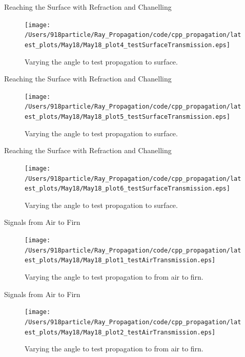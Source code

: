 \documentclass{beamer}
\begin{document}
\begin{frame}{Reaching the Surface with Refraction and Chanelling}
\begin{figure}
\begin{center}
\texttt{[image: /Users/918particle/Ray\_Propagation/code/cpp\_propagation/latest\_plots/May18/May18\_plot4\_testSurfaceTransmission.eps]}
\caption{\label{fig:fig9} Varying the angle to test propagation to surface.}
\end{center}
\end{figure}
\end{frame}

\begin{frame}{Reaching the Surface with Refraction and Chanelling}
\begin{figure}
\begin{center}
\texttt{[image: /Users/918particle/Ray\_Propagation/code/cpp\_propagation/latest\_plots/May18/May18\_plot5\_testSurfaceTransmission.eps]}
\caption{\label{fig:fig10} Varying the angle to test propagation to surface.}
\end{center}
\end{figure}
\end{frame}

\begin{frame}{Reaching the Surface with Refraction and Chanelling}
\begin{figure}
\begin{center}
\texttt{[image: /Users/918particle/Ray\_Propagation/code/cpp\_propagation/latest\_plots/May18/May18\_plot6\_testSurfaceTransmission.eps]}
\caption{\label{fig:fig11} Varying the angle to test propagation to surface.}
\end{center}
\end{figure}
\end{frame}

\begin{frame}{Signals from Air to Firn}
\begin{figure}
\begin{center}
\texttt{[image: /Users/918particle/Ray\_Propagation/code/cpp\_propagation/latest\_plots/May18/May18\_plot1\_testAirTransmission.eps]}
\caption{\label{fig:fig12} Varying the angle to test propagation to from air to firn.}
\end{center}
\end{figure}
\end{frame}

\begin{frame}{Signals from Air to Firn}
\begin{figure}
\begin{center}
\texttt{[image: /Users/918particle/Ray\_Propagation/code/cpp\_propagation/latest\_plots/May18/May18\_plot2\_testAirTransmission.eps]}
\caption{\label{fig:fig13} Varying the angle to test propagation to from air to firn.}
\end{center}
\end{figure}
\end{frame}
\end{document}
